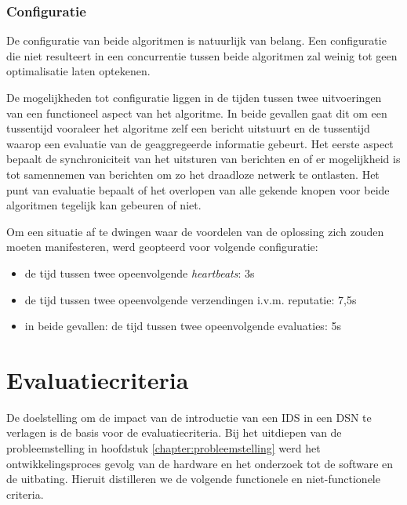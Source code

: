 \subsubsection{Configuratie}

De configuratie van beide algoritmen is natuurlijk van belang. Een configuratie
die niet resulteert in een concurrentie tussen beide algoritmen zal weinig tot
geen optimalisatie laten optekenen.

De mogelijkheden tot configuratie liggen in de tijden tussen twee uitvoeringen
van een functioneel aspect van het algoritme. In beide gevallen gaat dit om een
tussentijd vooraleer het algoritme zelf een bericht uitstuurt en de tussentijd
waarop een evaluatie van de geaggregeerde informatie gebeurt. Het eerste aspect
bepaalt de synchroniciteit van het uitsturen van berichten en of er
mogelijkheid is tot samennemen van berichten om zo het draadloze netwerk te
ontlasten. Het punt van evaluatie bepaalt of het overlopen van alle gekende
knopen voor beide algoritmen tegelijk kan gebeuren of niet.

Om een situatie af te dwingen waar de voordelen van de oplossing zich zouden
moeten manifesteren, werd geopteerd voor volgende configuratie:

\begin{itemize}[noitemsep, topsep=0pt, partopsep=0pt]

  \item de tijd tussen twee opeenvolgende \emph{heartbeats}: 3s

  \item de tijd tussen twee opeenvolgende verzendingen i.v.m. reputatie: 7,5s

  \item in beide gevallen: de tijd tussen twee opeenvolgende evaluaties: 5s

\end{itemize}

\vspace{-3mm}

\section{Evaluatiecriteria}
\label{section:criteria}

De doelstelling om de impact van de introductie van een IDS in een DSN te
verlagen is de basis voor de evaluatiecriteria. Bij het uitdiepen van de
probleemstelling in hoofdstuk \ref{chapter:probleemstelling} werd het
ontwikkelingsproces gevolg van de hardware en het onderzoek tot de software en
de uitbating. Hieruit distilleren we de volgende functionele en
niet-functionele criteria.

